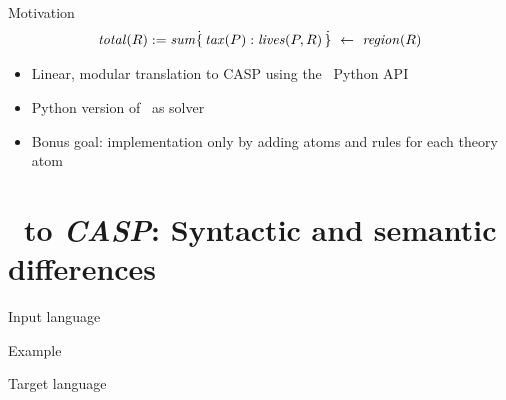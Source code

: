 \documentclass[11pt]{beamer}
\begin{document}
\begin{frame}{Motivation}
\begin{align*}
  \mathit{total}(R) := \mathit{sum}\dot{\{} \, \mathit{tax}(P) : \mathit{lives}(P,R) \,  \dot{\}} \ \leftarrow \ \mathit{region}(R)
\end{align*}
\pause
\small
\quad
\pause
\begin{itemize}
  \item Linear, modular translation to CASP using the \clingo\ Python API
  \pause
  \item Python version of \clingcon\ as solver
  \pause
  \item Bonus goal: implementation only by adding atoms and rules for each theory atom
\end{itemize}
\end{frame}

\begin{frame}
\tableofcontents
\end{frame}

\section{\HTC\ to \emph{CASP}: Syntactic and semantic differences}

\begin{frame}{Input language}
\scriptsize
\end{frame}

\begin{frame}{Example}
\scriptsize
\end{frame}

\begin{frame}{Target language}
\scriptsize
\end{frame}
\end{document}
